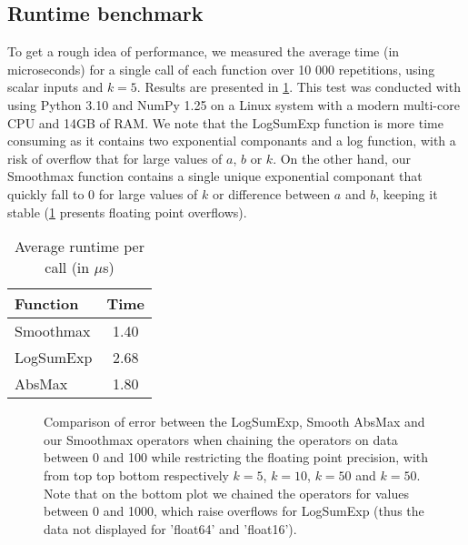 \subsection*{Runtime benchmark}

To get a rough idea of performance, we measured the average time (in microseconds) for a single call of each function over 10 000 repetitions, using scalar inputs and $k = 5$. Results are presented in \cref{tab:smoothmax-time}. This test was conducted with using Python 3.10 and NumPy 1.25 on a Linux system with a modern multi-core CPU and 14GB of RAM. We note that the LogSumExp function is more time consuming as it contains two exponential componants and a log function, with a risk of overflow that for large values of $a$, $b$ or $k$. On the other hand, our Smoothmax function contains a single unique exponential componant that quickly fall to 0 for large values of $k$ or difference between $a$ and $b$, keeping it stable (\cref{fig:smoothmax-precision-per-floating-point} presents floating point overflows).

\begin{table}[H]
    \centering
    \begin{tabular}{l|c}
        \toprule
        Function & Time \\
        \midrule
        Smoothmax & 1.40 \\
        LogSumExp & 2.68 \\
        AbsMax    & 1.80 \\
        \bottomrule
    \end{tabular}
    \caption{Average runtime per call (in $\mu$s)}
    \label{tab:smoothmax-time}
\end{table}

\begin{figure}
    \caption{Comparison of error between the LogSumExp, Smooth AbsMax and our Smoothmax operators when chaining the operators on data between 0 and 100 while restricting the floating point precision, with from top top bottom respectively $k=5$, $k=10$, $k=50$ and $k=50$. Note that on the bottom plot we chained the operators for values between 0 and 1000, which raise overflows for LogSumExp (thus the data not displayed for 'float64' and 'float16'). }
    \label{fig:smoothmax-precision-per-floating-point}
\end{figure}
\midConclusion

